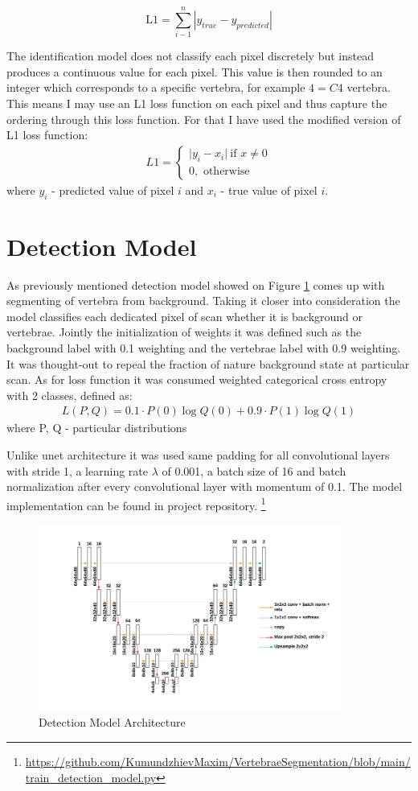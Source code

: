 \[ \text{L1} = \sum_{i-1}^n |y_{true} - y_{predicted}|\]

The identification model does not classify each pixel discretely but instead produces a continuous value for each pixel. This value is then rounded to an integer which corresponds to a specific vertebra, for example $4 = C4$ vertebra. This means I may use an L1 loss function on each pixel and thus capture the ordering through this loss function. For that I have used the modified version of L1 loss function: 
\begin{align*}
 L1 = \begin{cases} \lvert y_i - x_i \rvert\ \mbox{if } x\mbox{$\neq 0$} \\ 0, \mbox{ otherwise} \end{cases}
\end{align*}
where $y_i$ - predicted value of pixel $i$ and $x_i$ - true value of pixel $i$.


\section{Detection Model}
As previously mentioned detection model showed on Figure \ref{fig:detection_model} comes up with segmenting of vertebra from background. Taking it closer into consideration the model classifies each dedicated pixel of scan whether it is background or vertebrae. Jointly the initialization of weights it was  defined such as the background label with 0.1 weighting and the vertebrae label with 0.9 weighting. It was thought-out to repeal the fraction of nature background state at particular scan. As for loss function it was consumed \cite{Zhang2018} weighted categorical cross entropy with 2 classes, defined as:
\begin{align*}
 L(P, Q) = 0.1 \cdot P(0)\log Q(0) + 0.9 \cdot P(1)\log Q(1)
\end{align*}
where P, Q - particular distributions 

Unlike unet architecture it was used same padding for all convolutional layers with stride 1, a learning rate
$\lambda$ of 0.001, a batch size of 16 and batch normalization after every convolutional layer with momentum of 0.1. The model implementation can be found in project repository.
\footnote{ \url{https://github.com/KumundzhievMaxim/VertebraeSegmentation/blob/main/train_detection_model.py}}

\begin{figure}[h]
    \centering \includegraphics[width=10cm]{images/detection_model.png}
    \caption {Detection Model Architecture}
    \label{fig:detection_model}
\end{figure}
 
